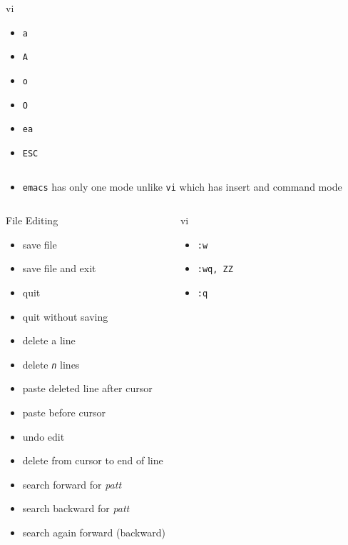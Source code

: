 \documentclass[slidestop,mathserif,compress,xcolor=svgnames]{beamer}
\newenvironment{eblock}[0]
{
\begin{beamerboxesrounded}[upper=uppercol2,lower=lowercol2,shadow=true]}
{\end{beamerboxesrounded}}
\begin{document}
\begin{frame}[allowframebreaks]
{\begin{columns}
\begin{eblock}{vi}
\begin{itemize}
      \item \texttt{a}
      \item \texttt{A}
      \item \texttt{o}
      \item \texttt{O}
      \item \texttt{ea}
      \item \texttt{ESC}
    \end{itemize}
    \end{eblock}
  \end{columns}
  }
  \begin{itemize}
    \item {\scriptsize \texttt{emacs} has only one mode unlike \texttt{vi} which has insert and command mode}
  \end{itemize}
  \framebreak
  {\scriptsize
   \begin{columns}
     \vspace{-0.5cm}
    \begin{eblock}{File Editing}
    \begin{itemize}
      \item save file
      \item save file and exit
      \item quit
      \item quit without saving
      \item delete a line
      \item delete \texttt{\textit{n}} lines
      \item paste deleted line after cursor
      \item paste before cursor
      \item undo edit
      \item delete from cursor to end of line
      \item search forward for \textit{patt}
      \item search backward for \textit{patt}
      \item search again forward (backward)
    \end{itemize}
    \end{eblock}
     \vspace{-0.5cm}
    \begin{eblock}{vi}
    \begin{itemize}
      \item \texttt{:w}
      \item \texttt{:wq, ZZ}
      \item \texttt{:q}

\end{itemize}
\end{eblock}
\end{columns}}
\end{frame}
\end{document}
